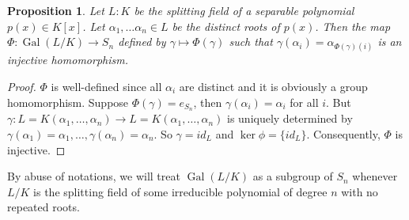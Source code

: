 \documentclass[11pt]{book}
\newtheorem{proposition}[theorem]{Proposition}
\begin{document}
\begin{proposition} \label{prop-injectToSymmetricGroups}
    Let $L:K$ be the splitting field of a separable polynomial $p(x)\in K[x]$. Let $\alpha_{1},\dots \alpha_{n}\in L$ be the distinct roots of $p(x)$. Then the map $\Phi:\operatorname{Gal}(L /K)\to S_{n}$ defined by $\gamma\mapsto \Phi(\gamma)$ such that $\gamma(\alpha_{i})=\alpha_{\Phi(\gamma)(i)}$ is an injective homomorphism. 
\end{proposition}

\begin{proof}
    $\Phi$ is well-defined since all $\alpha_{i}$ are distinct and it is obviously a group homomorphism. Suppose $\Phi(\gamma)=e_{S_{n}}$, then $\gamma(\alpha_{i})=\alpha_{i}$ for all $i$. But $\gamma:L=K(\alpha_{1},\dots, \alpha_{n})\to L=K(\alpha_{1},\dots, \alpha_{n})$ is uniquely determined by $\gamma(\alpha_{1})=\alpha_{1},\dots, \gamma(\alpha_{n})=\alpha_{n}$. So $\gamma=id_{L}$ and $\ker \phi = \{id_L\}$. Consequently, $\Phi$ is injective. 
\end{proof}

By abuse of notations, we will treat $\operatorname{Gal}(L /K)$ as a subgroup of $S_{n}$ whenever $L /K$ is the splitting field of some irreducible polynomial of degree $n$ with no repeated roots. 
\end{document}
